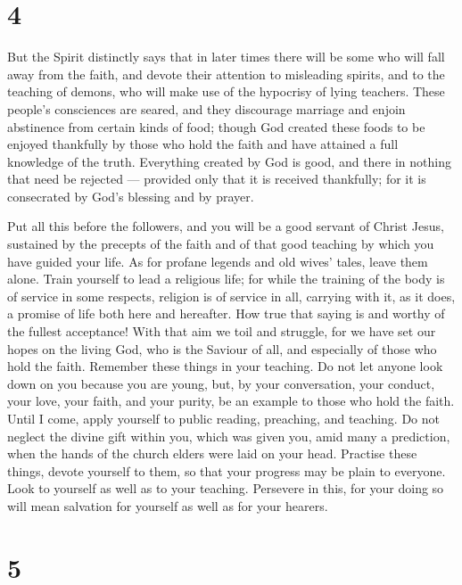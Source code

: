 \hypertarget{section-3}{%
\section{4}\label{section-3}}

 But the Spirit distinctly says that in later times there
will be some who will fall away from the faith, and devote their
attention to misleading spirits, and to the teaching of demons,
 who will make use of the hypocrisy of lying teachers. These
people's consciences are seared,  and they discourage
marriage and enjoin abstinence from certain kinds of food; though God
created these foods to be enjoyed thankfully by those who hold the faith
and have attained a full knowledge of the truth.  Everything
created by God is good, and there in nothing that need be rejected ---
provided only that it is received thankfully;  for it is
consecrated by God's blessing and by prayer.

 Put all this before the followers, and you will be a good
servant of Christ Jesus, sustained by the precepts of the faith and of
that good teaching by which you have guided your life.  As
for profane legends and old wives' tales, leave them alone. Train
yourself to lead a religious life;  for while the training
of the body is of service in some respects, religion is of service in
all, carrying with it, as it does, a promise of life both here and
hereafter.  How true that saying is and worthy of the
fullest acceptance!  With that aim we toil and struggle,
for we have set our hopes on the living God, who is the Saviour of all,
and especially of those who hold the faith.  Remember these
things in your teaching.  Do not let anyone look down on
you because you are young, but, by your conversation, your conduct, your
love, your faith, and your purity, be an example to those who hold the
faith.  Until I come, apply yourself to public reading,
preaching, and teaching.  Do not neglect the divine gift
within you, which was given you, amid many a prediction, when the hands
of the church elders were laid on your head.  Practise
these things, devote yourself to them, so that your progress may be
plain to everyone.  Look to yourself as well as to your
teaching. Persevere in this, for your doing so will mean salvation for
yourself as well as for your hearers.

\hypertarget{section-4}{%
\section{5}\label{section-4}}

